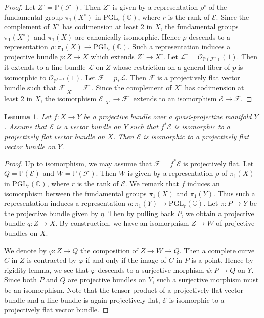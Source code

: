 \documentclass[english,reqno]{amsart}
\newcommand\bbP{{\mathbb P}}
\newcommand\sE{{\mathscr E}}
\newcommand\sF{{\mathscr F}}
\newcommand\sL{{\mathscr L}}
\newcommand\sO{{\mathscr O}}
\theoremstyle{plain}
\newtheorem{lemma}[thm]{Lemma}
\theoremstyle{definition}
\numberwithin{equation}{section} %
\begin{document}
\begin{proof}
Let  $Z^\circ = \mathbb{P}(\sF^\circ)$.  Then $Z^\circ$ is given by a representation $\rho^\circ$ of the fundamental group $\pi_1(X^\circ)$ in $\mathrm{PGL}_{r}(\mathbb{C})$, where $r$ is the rank of $\sE$.
Since the complement of $X^\circ$ has codimension at least 2 in $X$, the fundamental groups  $\pi_1(X^\circ)$  and  $\pi_1(X)$ are canonically isomorphic.
Hence $\rho$ descends to a representation $\rho\colon \pi_{1}(X) \to \mathrm{PGL}_r(\mathbb{C})$. Such a representation induces a projective bundle $p\colon Z \to X$ which extends $Z^\circ \to X^\circ$. Let $\sL^\circ = \sO_{\mathbb{P}(\sF^\circ)}(1)$.
Then it extends to a line bundle $\sL$ on $Z$ whose restriction on a general fiber of $p$ is isomorphic to $\sO_{\bbP^{r-1}}(1)$.
Let $\sF = p_*\sL$.
Then $\sF$ is a projectively flat vector bundle such that $\sF|_{X^\circ}=\sF^\circ$.
Since  the complement of $X^\circ$ has codimension at least 2 in $X$, the isomorphism $\sE|_{X^\circ} \to \sF^\circ$ extends to an isomorphism $\sE \to \sF$.
\end{proof}





\begin{lemma}
\label{lemma:proj-flat-vec-bundle-property2}
Let $f:X\to Y$ be a projective bundle over a quasi-projective manifold $Y$. Assume that $\sE$ is a vector bundle on $Y$ such that $f^*\sE$ is isomorphic to a projectively flat vector bundle on $X$. Then $\sE$ is isomorphic to a projectively flat vector bundle on $Y$.
\end{lemma}

\begin{proof}
Up to isomorphism, we may assume that $\sF = f^*\sE$ is projectively flat. Let $Q=\bbP(\sE)$ and $W = \bbP(\sF)$.
Then $W$ is given by a representation $\rho$ of $\pi_1(X)$ in $\mathrm{PGL}_{r}(\mathbb{C})$, where $r$ is the rank of $\sE$.
We remark that $f$ induces an isomorphism between the fundamental groups $\pi_1(X)$ and $\pi_1(Y)$.
Thus such a representation induces a representation $\eta\colon \pi_1(Y) \to \mathrm{PGL}_r(\mathbb{C})$.  Let $\pi\colon P\to Y$ be the projective bundle given by $\eta$. Then by pulling back $P$, we obtain a projective bundle $q\colon Z\to X$.
By construction, we have an isomorphism $Z\to W$ of projective bundles on $X$.

We denote by $\varphi\colon Z\to Q$ the composition of $Z\to W \to Q.$
Then a complete curve $C$ in $Z$ is contracted by $\varphi$ if and only if the image of $C$ in $P$ is a point.
Hence by rigidity lemma, we see that  $\varphi$ descends to a surjective morphism $\psi\colon P \to Q$ on $Y$.
Since both $P$ and $Q$ are projective bundles on $Y$, such a surjective morphism must be an isomorphism.  Note that the tensor product of a projectively flat vector bundle and a line bundle is again projectively flat, $\sE$ is isomorphic to a projectively flat vector bundle.
\end{proof}
\end{document}

